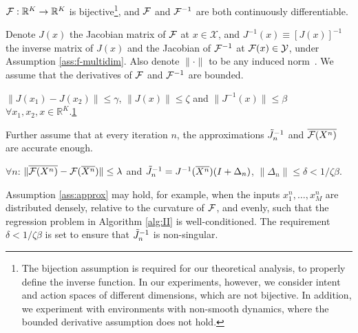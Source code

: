 \documentclass[nohyperref]{article}
\begin{document}
\begin{assumption}\label{ass:f-multidim}
    $\mathcal{F}:\mathbb{R}^K\to\mathbb{R}^K$ is bijective\footnote{\label{foot:bijetion}The bijection assumption is required for our theoretical analysis, to properly define the inverse function. In our experiments, however, we consider intent and action spaces of different dimensions, which are not bijective. In addition, we experiment with environments with non-smooth dynamics, where the bounded derivative assumption does not hold.}, and $\mathcal{F}$ and $\mathcal{F}^{-1}$ are both continuously differentiable.
\end{assumption}
Denote $J(x)$ the Jacobian matrix of $\mathcal{F}$ at $x\in\mathcal{X}$, and $J^{-1}(x)\equiv[J(x)]^{-1}$ the inverse matrix of $J(x)$ and the Jacobian of $\mathcal{F}^{-1}$ at $\mathcal{F}(x)\in\mathcal{Y}$, under Assumption \ref{ass:f-multidim}. Also denote $\|\cdot\|$ to be any induced norm~\citep{matrixanalysisbook}. We assume that the derivatives of $\mathcal{F}$ and $\mathcal{F}^{-1}$ are bounded.
\begin{assumption}\label{ass:d-bounds}
    $\| J(x_1) - J(x_2) \| \leq \gamma$, $\| J(x) \| \leq \zeta$ and $\| J^{-1}(x) \| \leq \beta$ $\forall x_1,x_2,x\in\mathbb{R}^K$.\cref{foot:bijetion}
\end{assumption}
Further assume that at every iteration $n$, the approximations $\Tilde{J}_n^{-1}$ and $\overline{\mathcal{F}(X^n)}$ are accurate enough. 
\begin{assumption}\label{ass:approx}
    $\forall n$: $\| \overline{\mathcal{F}(X^n)}-\mathcal{F}(\overline{X^n})\|\leq \lambda$ and $\Tilde{J}_n^{-1}=J^{-1}(\overline{X^n})(I+\Delta_n)$, $\| \Delta_n \| \leq \delta < 1/{\zeta \beta}$.
\end{assumption}
Assumption \ref{ass:approx} may hold, for example, when the inputs $x_1^n,\dots,x_M^n$ are distributed densely, relative to the curvature of $\mathcal{F}$, and evenly, such that the regression problem in Algorithm \ref{alg:II} is well-conditioned. The requirement $\delta<1/\zeta\beta$ is set to ensure that $\Tilde{J}_n^{-1}$ is non-singular. 
\end{document}
